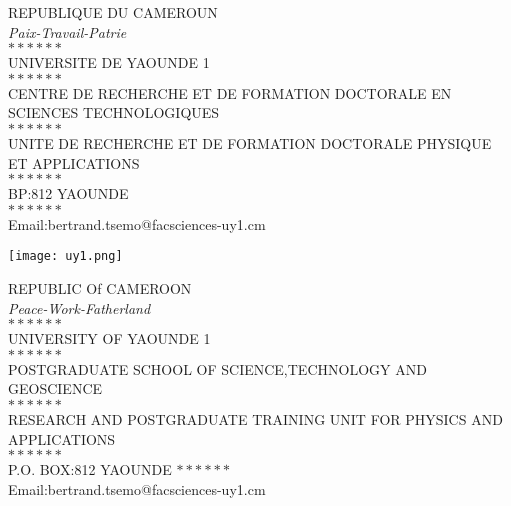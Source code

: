 \documentclass[a4paper,12pt]{article}
\begin{document}
	\begin{titlepage}
	\begin{center}
		\begin{minipage}{6cm}
			\begin{center}
				REPUBLIQUE DU CAMEROUN\\
				\textit{Paix-Travail-Patrie}\\
				$\ast\ast\ast\ast\ast\ast$\\
				UNIVERSITE DE YAOUNDE 1\\
				$\ast\ast\ast\ast\ast\ast$\\
				CENTRE DE RECHERCHE ET DE FORMATION DOCTORALE EN SCIENCES TECHNOLOGIQUES\\
				$\ast\ast\ast\ast\ast\ast$\\
				UNITE DE RECHERCHE ET DE FORMATION DOCTORALE PHYSIQUE ET APPLICATIONS\\
				$\ast\ast\ast\ast\ast\ast$\\
				BP:812 YAOUNDE\\
				$\ast\ast\ast\ast\ast\ast$\\
				Email:bertrand.tsemo@facsciences-uy1.cm
			\end{center}
		\end{minipage}\hfill
		\begin{minipage}{2cm}
			\begin{center}
				\texttt{[image: uy1.png]}
			\end{center}
		\end{minipage}\hfill
		\begin{minipage}{6cm}
			\begin{center}
				REPUBLIC Of CAMEROON\\
				\textit{Peace-Work-Fatherland}\\
				$\ast\ast\ast\ast\ast\ast$\\
				UNIVERSITY OF YAOUNDE 1\\
				$\ast\ast\ast\ast\ast\ast$\\
				POSTGRADUATE SCHOOL OF SCIENCE,TECHNOLOGY AND GEOSCIENCE\\
				$\ast\ast\ast\ast\ast\ast$\\
				RESEARCH AND POSTGRADUATE TRAINING UNIT FOR PHYSICS AND APPLICATIONS\\
				$\ast\ast\ast\ast\ast\ast$\\
				P.O. BOX:812 YAOUNDE
				$\ast\ast\ast\ast\ast\ast$\\
				Email:bertrand.tsemo@facsciences-uy1.cm
			\end{center}	

\end{minipage}
\end{center}
\end{titlepage}
\end{document}
